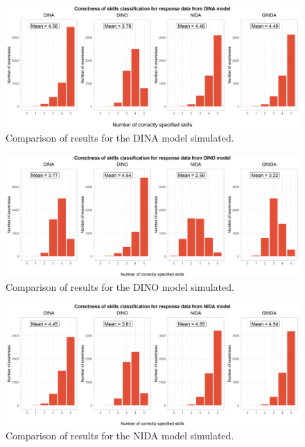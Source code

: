 \documentclass[english]{pwr_wmat_praca_dyplomowa}
\theoremstyle{plain}
\numberwithin{theorem}{chapter}
\theoremstyle{definition}
\numberwithin{theorem}{chapter}
\begin{document}
	\begin{figure}[h!]
		\centering
		\includegraphics[width=\textwidth]{DINA_skills_classification_col.png}
		\caption{Comparison of results for the DINA model simulated.}
		\label{comparison_dina}
	\end{figure}
	
	\begin{figure}[h!]
		\centering
		\includegraphics[width=\textwidth]{DINO_skills_classification_col.png}
		\caption{Comparison of results for the DINO model simulated.}
		\label{comparison_dino}
	\end{figure}
	
	\begin{figure}[h!]
		\centering
		\includegraphics[width=\textwidth]{NIDA_skills_classification_col.png}
		\caption{Comparison of results for the NIDA model simulated.}
		\label{comparison_nida}
	\end{figure}
	
\end{document}
